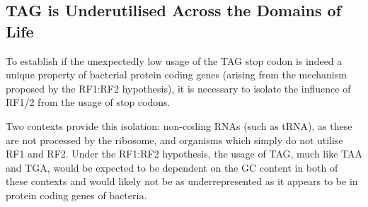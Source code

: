 \documentclass[../main.tex]{subfile}
\begin{document}
    \subsection{TAG is Underutilised Across the Domains of Life}
        To establish if the unexpectedly low usage of the TAG stop codon is indeed a unique property of bacterial protein coding genes (arising from the mechanism proposed by the RF1:RF2 hypothesis), it is necessary to isolate the influence of RF1/2 from the usage of stop codons.

        Two contexts provide this isolation: non-coding RNAs (such as tRNA), as these are not processed by the ribosome, and organisms which simply do not utilise RF1 and RF2. Under the RF1:RF2 hypothesis, the usage of TAG, much like TAA and TGA, would be expected to be dependent on the GC content in both of these contexts and would likely not be as underrepresented as it appears to be in protein coding genes of bacteria.
\end{document}
